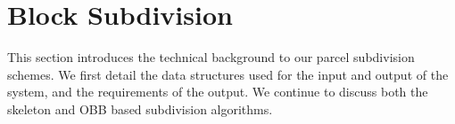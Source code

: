 


\section{Block Subdivision}
\label{sec:blockSubdivision}

This section introduces the technical background to our parcel subdivision schemes. We first detail the data structures used for the input and output of the system, and the requirements of the output. We continue to discuss both the skeleton and OBB based subdivision algorithms.




